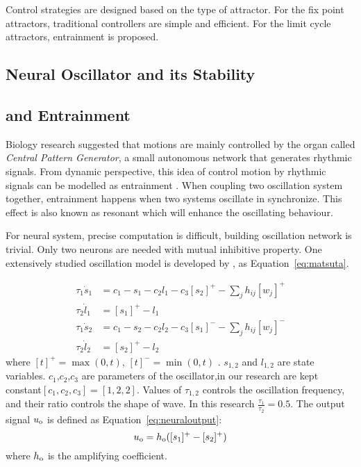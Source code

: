 Control strategies are designed based on the type of attractor.
For the fix point attractors, traditional \pd controllers are simple and efficient.
For the limit cycle attractors,  entrainment is proposed.


\subsection{Neural Oscillator and its Stability}


\subsection{\cpg and Entrainment}
Biology research suggested that motions are mainly controlled by the organ called \emph{Central Pattern Generator}, a small autonomous network that generates rhythmic signals.
From dynamic perspective, this idea of control motion by rhythmic signals can be modelled as entrainment \citep{Gonz'alez-Miranda2004}.
When coupling two oscillation system together, entrainment happens when two systems oscillate in synchronize. 
This effect is also known as resonant which will enhance the oscillating behaviour. 


For neural system, precise computation is difficult,  building oscillation network is trivial. 
Only two neurons are needed with mutual inhibitive property.
One extensively studied oscillation model is developed by \citet{neurooscillation}, as Equation~\ref{eq:matsuta}.

\begin{align}
\tau_{1} \dot{s}_{1}&=c_1-s_{1}-c_2 l_{1}-c_3 [s_{2}]^{+}-\sum_{j}h_{ij}[w_{j}]^{+} \nonumber\\
\tau_{2} \dot{l}_{1}&=[s_{1}]^{+}-l_{1} \nonumber\\
\tau_{1} \dot{s}_{2}&=c_1-s_{2}-c_2 l_{2}-c_3 [s_{1}]^{-}-\sum_{j}h_{ij}[w_{j}]^{-} \nonumber\\
\tau_{2} \dot{l}_{2}&=[s_{2}]^{+}-l_{2}
\label{eq:matsuta}
\end{align}
where $[t]^{+}=\max(0,t)$, $[t]^{-}=\min(0,t)$ .
$s_{1,2}$ and $l_{1,2}$ are state variables.
$c_1$,$c_2$,$c_3$ are parameters of the oscillator,in our research are kept constant$[c_1,c_2,c_3]=[1,2,2]$.
Values of $\tau_{1,2}$ controls the oscillation frequency, and their ratio controls the shape of wave.
In this research $\frac{\tau_{1}}{\tau_{2}}=0.5$.
The output signal $u_{\mathrm{o}}$ is defined as Equation~\ref{eq:neuraloutput}:
\begin{equation}
u_{\mathrm{o}}=h_{\mathrm{o}}([s_{1}]^{+}-[s_{2}]^{+})
\label{eq:neuraloutput}
\end{equation}
where $h_{\mathrm{o}}$ is the amplifying coefficient.

